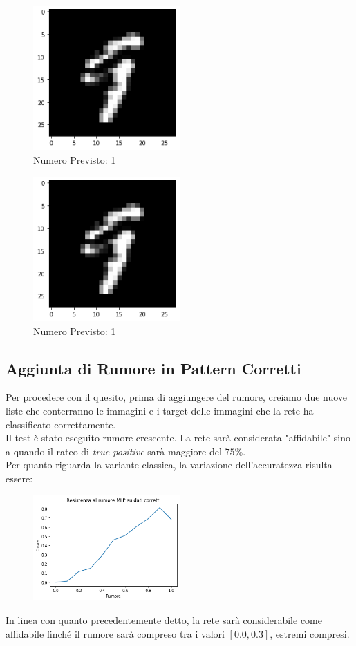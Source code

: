\documentclass[12pt, a4paper]{article}
\begin{document}
\begin{figure}[H]
    \centering
    \caption{Numero Previsto: 1}
    \includegraphics[width=0.50\textwidth]{nove4.png}
\end{figure}
\begin{figure}[H]
    \centering
    \caption{Numero Previsto: 1}
    \includegraphics[width=0.50\textwidth]{nove5.png}
\end{figure}

\subsection{Aggiunta di Rumore in Pattern Corretti}
Per procedere con il quesito, prima di aggiungere del rumore, creiamo due nuove liste che conterranno le immagini e i target delle immagini che la rete ha classificato correttamente.\\
Il test è stato eseguito rumore crescente. La rete sarà considerata "affidabile" sino a quando il rateo di \textit{true positive} sarà maggiore del \(75\%\).\\
Per quanto riguarda la variante classica, la variazione dell'accuratezza risulta essere:
\begin{figure}[H]
    \centering
    \includegraphics[width=0.50\textwidth]{TPClassica.png}    
\end{figure}
In linea con quanto precedentemente detto, la rete sarà considerabile come affidabile finché il rumore sarà compreso tra i valori \([0.0, 0.3]\), estremi compresi.\\
\end{document}
